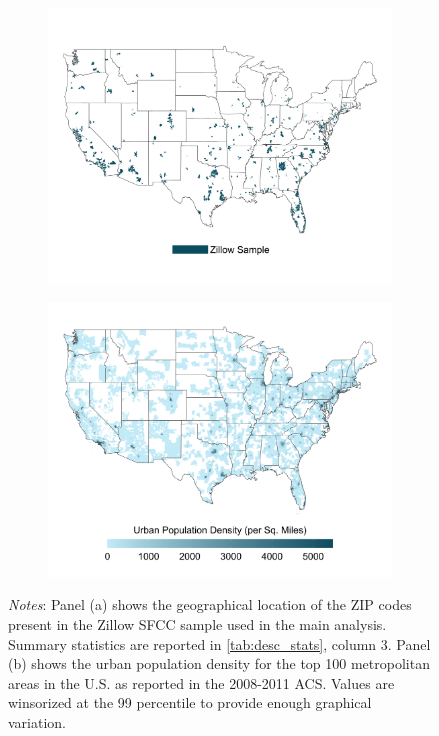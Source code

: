 \clearpage
\begin{figure}
	\caption{Comparison Between Zillow Sample and Population Density}
	\label{fig:maps}
	\begin{subfigure}[b]{\textwidth}\centering
		\includegraphics[width = .85\textwidth]{../../analysis/descriptive_maps/output/sample_map.png}
	\end{subfigure}
	\quad 
	\begin{subfigure}[b]{\textwidth}\centering
		\includegraphics[width = .85\textwidth]{../../analysis/descriptive_maps/output/popurban_density_map.png}
	\end{subfigure}
		\begin{minipage}{.95\textwidth} \footnotesize
		\vspace{2mm} 
		\textit{Notes}: Panel (a) shows the geographical location of the ZIP codes present in the Zillow 
		SFCC sample 	used in the main analysis. Summary statistics are reported in 
		\autoref{tab:desc_stats}, column 3. Panel (b) shows the urban population density for the top 100 
		metropolitan areas in the U.S. as reported in the 2008-2011 ACS. Values are winsorized at the 99 
		percentile to provide enough graphical variation. 
	\end{minipage}
\end{figure}

